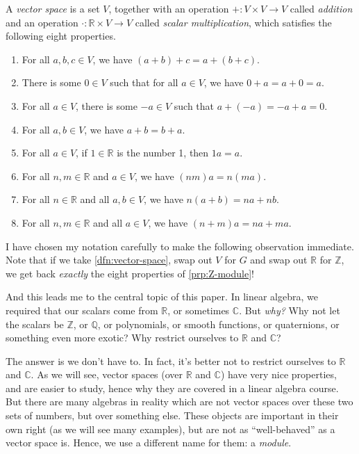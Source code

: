 \begin{definition}\label{dfn:vector-space}
	A \emph{vector space} is a set $V$, together with an operation $+: V\times V \to V$ called \emph{addition} and an operation $\cdot : \mathbb{R} \times V \to V$ called \emph{scalar multiplication}, which satisfies the following eight properties.
	\begin{enumerate}
		\item For all $a,b,c\in V$, we have $(a+b)+c = a+(b+c)$.
		\item There is some $0\in V$ such that for all $a\in V$, we have $0+a=a+0=a$.
		\item For all $a\in V$, there is some $-a\in V$ such that $a+(-a)=-a+a=0$.
		\item For all $a,b\in V$, we have $a+b=b+a$.
		\item For all $a\in V$, if $1\in\mathbb{R} $ is the number 1, then $1a=a$.
		\item For all $n,m\in\mathbb{R} $ and $a\in V$, we have $(nm)a=n(ma)$.
		\item For all $n\in\mathbb{R} $ and all $a,b\in V$, we have $n(a+b)=na+nb$.
		\item For all $n,m\in\mathbb{R} $ and all $a\in V$, we have $(n+m)a=na+ma$.
	\end{enumerate}
\end{definition}

I have chosen my notation carefully to make the following observation immediate. Note that if we take \cref{dfn:vector-space}, swap out $V$ for $G$ and swap out $\mathbb{R} $ for $\mathbb{Z} $, we get back \emph{exactly} the eight properties of \cref{prp:Z-module}!

And this leads me to the central topic of this paper. In linear algebra, we required that our scalars come from $\mathbb{R} $, or sometimes $\mathbb{C} $. But \emph{why?} Why not let the scalars be $\mathbb{Z} $, or $\mathbb{Q} $, or polynomials, or smooth functions, or quaternions, or something even more exotic? Why restrict ourselves to $\mathbb{R} $ and $\mathbb{C} $?

The answer is we don't have to. In fact, it's better not to restrict ourselves to $\mathbb{R} $ and $\mathbb{C} $. As we will see, vector spaces (over $\mathbb{R} $ and $\mathbb{C} $) have very nice properties, and are easier to study, hence why they are covered in a linear algebra course. But there are many algebras in reality which are not vector spaces over these two sets of numbers, but over something else. These objects are important in their own right (as we will see many examples), but are not as ``well-behaved'' as a vector space is. Hence, we use a different name for them: a \emph{module}.

